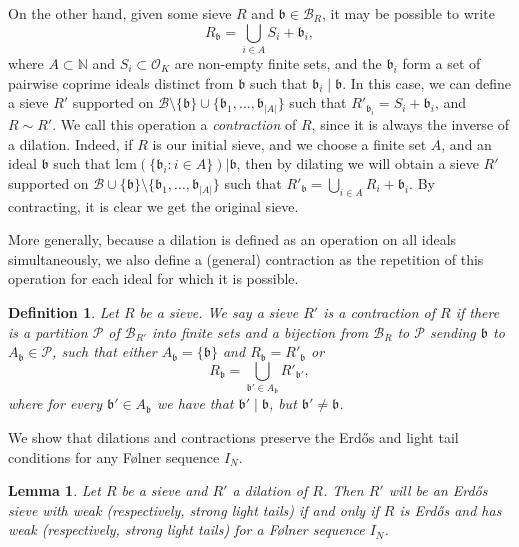 \documentclass[a4paper,11pt,reqno]{amsart}
\theoremstyle{plain}
\newtheorem{lemma}[theorem]{Lemma}
\newtheorem{definition}[theorem]{Definition}
\theoremstyle{remark}
\newcommand{\cb}{\mathcal{B}}
\newcommand{\co}{\mathcal{O}}
\newcommand{\cp}{\mathcal{P}}
\newcommand{\gb}{\mathfrak{b}}
\begin{document}
		On the other hand, given some sieve $R$ and $\gb \in \cb_R$, it may be possible to write $$R_\gb = \bigcup_{i \in A} S_i + \gb_i,$$ where $A \subset \mathbb{N}$ and  $S_i\subset \co_K$ are non-empty finite sets, and the $\gb_i$ form a set of pairwise coprime ideals distinct from $\gb$ such that $\gb_i \mid \gb$.  In this case, we can define a  sieve $R'$ supported on $\cb\setminus\{\gb\}\cup\{\gb_1,\dots,\gb_{|A|}\}$ such that $R'_{\gb_{i}} = S_i + \gb_i $, and $R \sim R'$. We call this operation a \textit{contraction} of $R$, since it is always the inverse of a dilation. Indeed, if $R$ is our initial sieve, and we choose a finite set $A$, and an ideal $\gb$ such that $\text{lcm}(\{\gb_i:i\in A\})|\gb$, then by dilating we will obtain a sieve $R'$ supported on $\cb\cup\{\gb\}\setminus\{\gb_1,\dots,\gb_{|A|}\}$ such that $R'_\gb = \bigcup_{i \in A} R_i + \gb_i$. By contracting, it is clear we get the original sieve. 
		
		More generally, because a dilation is defined as an operation on all ideals simultaneously, we also define a (general) contraction as the repetition of this operation for each ideal for which it is possible.
		
		\begin{definition}
			\label{def: contraction}
			Let $R$ be a sieve. We say a sieve $R'$ is a contraction of $R$ if there is a partition $\cp$ of $\cb_{R'}$ into finite sets and a bijection from $\cb_R$ to $\cp$ sending $\gb$ to $A_\gb \in \cp$, such that either $A_\gb = \{\gb\}$ and $R_\gb = R'_{\gb}$ or $$R_\gb  = \bigcup_{\gb' \in A_\gb} R'_{\gb'}, $$ where for every $\gb' \in A_\gb$ we have that $\gb' \mid \gb$, but $\gb' \neq \gb$.
		\end{definition}
		
		We show that dilations and contractions preserve the Erdős and light tail conditions for any Følner sequence $I_N$.
		
		
		\begin{lemma}
			\label{lm: Erds and light tails preserved by change of base}
			Let $R$ be a sieve and $R'$ a dilation of $R$. Then $R'$ will be an Erdős sieve with weak (respectively, strong light tails) if and only if $R$ is Erdős and has weak (respectively, strong light tails) for a Følner sequence $I_N$. 
		
		\end{lemma}
		
\end{document}
